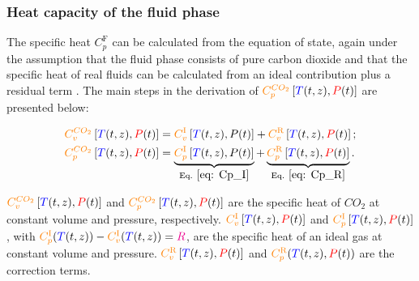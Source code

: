 \documentclass[../Article_Model_Parameters.tex]{subfiles}
\begin{document}
	\subsubsection{Heat capacity of the fluid phase} \label{subsubsec: Fluid heat capacity}
	
	The specific heat $C_p^{\text{F}}$ can be calculated from the equation of state, again under the assumption that the fluid phase consists of pure carbon dioxide and that the specific heat of real fluids can be calculated from an ideal contribution plus a residual term \citet{Pratt2001}. The main steps in the derivation of ${\color{orange}C^{CO_2}_p}\left[{\color{blue}T}(t,z), {\color{red}P}(t)\right]$ are presented below: 
	
	{\footnotesize
	\begin{subequations}\begin{align}
			{\color{orange}C^{CO_2}_v}\left[{\color{blue}T}(t,z), {\color{red}P}(t)\right] & = {\color{orange}C_v^{\text{I}}}\left[{\color{blue}T}(t,z),P(t)\right] + {\color{orange}C_v^{\text{R}}}\left[{\color{blue}T}(t,z), {\color{red}P}(t)\right] \label{eq: Cv_CO2}; \\ 
			{\color{orange}C^{CO_2}_p}\left[{\color{blue}T}(t,z), {\color{red}P}(t)\right] & = \underbrace{{\color{orange}C_p^{\text{I}}}\left[{\color{blue}T}(t,z),P(t)\right]}_{\text{Eq. } \eqref{eq: Cp_I}} + \underbrace{{\color{orange}C_p^{\text{R}}}\left[{\color{blue}T}(t,z), {\color{red}P}(t)\right]}_{\text{Eq. } \eqref{eq: Cp_R}}  \label{eq: Cp_CO2}.
	\end{align}\end{subequations} }

	${\color{orange}C^{CO_2}_v}\left[{\color{blue}T}(t,z), {\color{red}P}(t)\right]$ and ${\color{orange}C^{CO_2}_p}\left[{\color{blue}T}(t,z), {\color{red}P}(t)\right]$ are the specific heat of $CO_2$ at constant volume and pressure, respectively. ${\color{orange}C_v^{\text{I}}}\left[{\color{blue}T}(t,z), {\color{red}P}(t)\right]$ and ${\color{orange}C_p^{\text{I}}}\left[{\color{blue}T}(t,z), {\color{red}P}(t)\right]$, with ${\color{orange}C_p^{\text{I}}}({\color{blue}T}(t,z)) - {\color{orange}C_v^{\text{I}}}({\color{blue}T}(t,z)) = {\color{magenta}R}$, are the specific heat of an ideal gas at constant volume and pressure. ${\color{orange}C_v^{\text{R}}}\left[{\color{blue}T}(t,z), {\color{red}P}(t)\right]$ and ${\color{orange}C_p^{\text{R}}}({\color{blue}T}(t,z), {\color{red}P}(t))$ are the correction terms. \\
	
\end{document}
